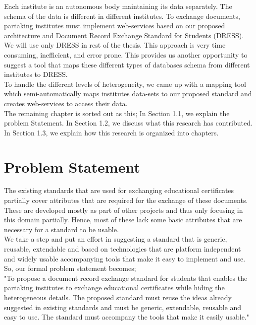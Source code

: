\documentclass[12pt,a4paper,oneside]{book}
\begin{document}
Each institute is an autonomous body maintaining its data separately. The schema of the data is different in different institutes. To exchange documents, partaking institutes must implement web-services based on our proposed architecture and Document Record Exchange Standard for Students (DRESS). We will use only DRESS in rest of the thesis. This approach is very time consuming, inefficient, and error prone. This provides us another  opportunity to suggest a tool that maps these different types of databases schema from different institutes to DRESS. \\

To handle the different levels of heterogeneity, we came up with a mapping tool which semi-automatically maps institutes data-sets to our proposed standard and creates web-services to access their data. \\

The remaining chapter is sorted out as this; In Section 1.1, we explain the problem Statement. In Section 1.2, we discuss what this research has contributed. In Section 1.3, we explain how this research is organized into chapters.

\section{Problem Statement}\label{s-problem_statement}

The existing standards that are used for exchanging educational certificates partially cover attributes that are required for the exchange of these documents. These are developed mostly as part of other projects and thus only focusing in this domain partially. Hence, most of these lack some basic attributes that are necessary for a standard to be usable. \\

We take a step and put an effort in suggesting a standard that is generic, reusable, extendable and based on technologies that are platform independent and widely usable accompanying tools that make it easy to implement and use. So, our formal problem statement becomes; \\   

"To propose a document record exchange standard for students that enables the partaking institutes to exchange educational certificates while hiding the heterogeneous details. The proposed standard must reuse the ideas already suggested in existing standards and must be generic, extendable, reusable and easy to use. The standard must accompany the tools that make it easily usable." 
\end{document}
